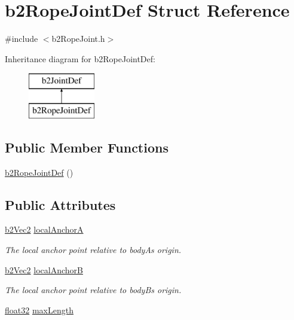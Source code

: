 \hypertarget{structb2_rope_joint_def}{}\section{b2\+Rope\+Joint\+Def Struct Reference}
\label{structb2_rope_joint_def}


{\ttfamily \#include $<$b2\+Rope\+Joint.\+h$>$}

Inheritance diagram for b2\+Rope\+Joint\+Def\+:\begin{figure}[H]
\begin{center}
\leavevmode
\includegraphics[height=2.000000cm]{structb2_rope_joint_def}
\end{center}
\end{figure}
\subsection*{Public Member Functions}
\begin{DoxyCompactItemize}
\item 
\mbox{\hyperlink{structb2_rope_joint_def_abb2efd3b2edbd4df73dbbc32a2f01f92}{b2\+Rope\+Joint\+Def}} ()
\end{DoxyCompactItemize}
\subsection*{Public Attributes}
\begin{DoxyCompactItemize}
\item 
\mbox{\hyperlink{structb2_vec2}{b2\+Vec2}} \mbox{\hyperlink{structb2_rope_joint_def_ab680fcc3cd44741a7a824ddff86ff01e}{local\+AnchorA}}
\begin{DoxyCompactList}\small\item\em The local anchor point relative to bodyA\textquotesingle{}s origin. \end{DoxyCompactList}\item 
\mbox{\hyperlink{structb2_vec2}{b2\+Vec2}} \mbox{\hyperlink{structb2_rope_joint_def_a3271da0e4027e25546aa6a81e8fbe4e2}{local\+AnchorB}}
\begin{DoxyCompactList}\small\item\em The local anchor point relative to bodyB\textquotesingle{}s origin. \end{DoxyCompactList}\item 
\mbox{\hyperlink{b2_settings_8h_aacdc525d6f7bddb3ae95d5c311bd06a1}{float32}} \mbox{\hyperlink{structb2_rope_joint_def_a6efdcae22e2bdcfc3aae62da1a5f0d69}{max\+Length}}
\end{DoxyCompactItemize}


